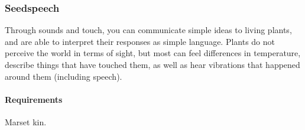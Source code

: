     \subsubsection{Seedspeech} \label{feat::seedspeech}
        Through sounds and touch, you can communicate simple ideas to living plants, and are able to interpret their responses as simple language.
        Plants do not perceive the world in terms of sight, but most can feel differences in temperature, describe things that have touched them, as well as hear vibrations that happened around them (including speech).
        \paragraph{Requirements} Marset kin.

\newpage
